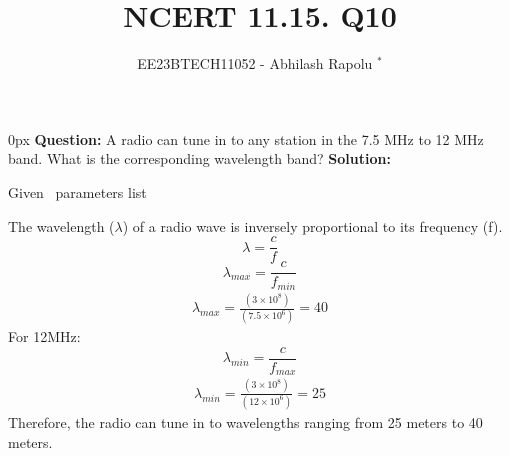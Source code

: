 \documentclass[journal,12pt,twocolumn]{IEEEtran}
\begin{document}

\vspace{3cm}
\title{NCERT 11.15. Q10}
\author{EE23BTECH11052 - Abhilash Rapolu $^{*}$%
}
\maketitle
\newpage
\bigskip
\renewcommand{\thetable}{\arabic{table}}

\parindent 0px
\textbf{Question:} A radio can tune in to any station in the 7.5 MHz to 12 MHz band.
 What is the corresponding wavelength band? 
\textbf{Solution:}  
\begin{table}[htbp] \small
\centering

\caption{Given \, parameters list}\end{table}
The wavelength ($\lambda$) of a radio wave is inversely proportional to its frequency (f).
\bgroup \obeylines
$$\lambda=\frac{c}{f}$$
$$\lambda_{max}=\frac{c}{f_{min}}$$
\egroup
\begin{align}
\lambda_{max}=\frac{(3\times10^{8})}{(7.5\times10^{6})}=40
\end{align}
For 12MHz:
$$\lambda_{min}=\frac{c}{f_{max}}$$
\begin{align}
\lambda_{min}=\frac{(3\times10^{8})}{(12\times10^{6})}=25
\end{align}
Therefore, the radio can tune in to wavelengths ranging from 25 meters to 40 meters.
\end{document}
